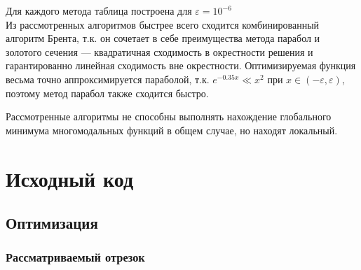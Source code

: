 \begin{center}
\end{center}

Для каждого метода таблица построена для $\varepsilon = 10^{-6}$\\

Из рассмотренных алгоритмов быстрее всего сходится комбинированный алгоритм Брента, т.к. он сочетает в себе преимущества метода парабол и золотого сечения --- квадратичная сходимость в окрестности решения и гарантированно линейная сходимость вне окрестности. Оптимизируемая функция весьма точно аппроксимируется параболой, т.к. \(e^{ - 0.35 x} \ll x^2\) при \(x\in( - \varepsilon, \varepsilon)\), поэтому метод парабол также сходится быстро.

Рассмотренные алгоритмы не способны выполнять нахождение глобального минимума многомодальных функций в общем случае, но находят локальный.

\newpage
\section{Исходный код}

\subsection{Оптимизация}

\subsubsection{Рассматриваемый отрезок}
\newpage

